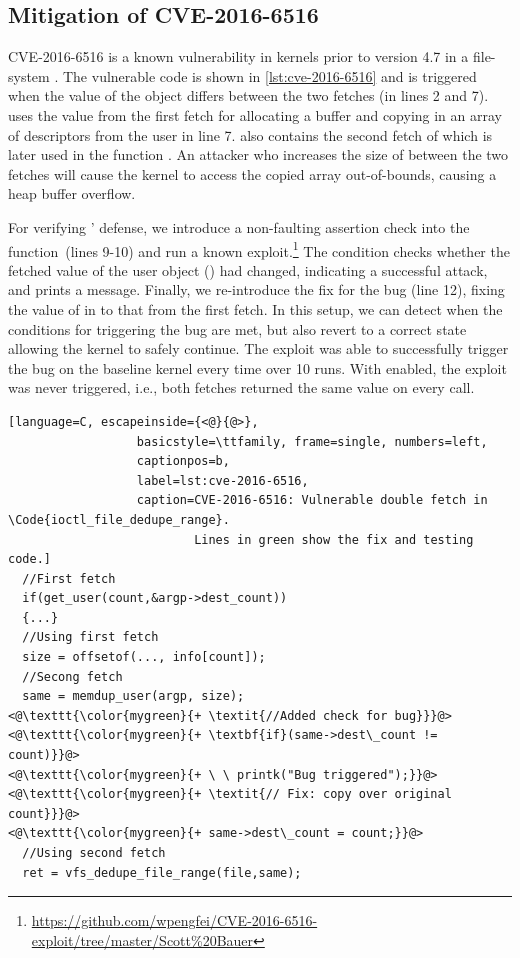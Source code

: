 \documentclass[letterpaper,twocolumn,10pt]{article}
\begin{document}
\subsection{Mitigation of CVE-2016-6516}

CVE-2016-6516 is a known vulnerability in kernels prior to version
4.7 in a file-system .
The vulnerable code is shown in \autoref{lst:cve-2016-6516} and is
triggered when the value of the  object differs between
the two fetches (in lines 2 and 7).
 uses the value from the first fetch for allocating a buffer
and copying in an array of descriptors from the user in line 7.
 also contains the second fetch of 
which is later used in the function .
An attacker who increases the size of  between the
two fetches will cause the kernel to access the copied array out-of-bounds,
causing a heap buffer overflow.

For verifying \midas' defense, we introduce a non-faulting assertion
check into the function~(lines 9-10) and run a known
exploit.\footnote{\url{https://github.com/wpengfei/CVE-2016-6516-exploit/tree/master/Scott\%20Bauer}}
The condition checks whether the fetched value of the user object ()
had changed, indicating a successful attack, and prints a message.
Finally, we re-introduce the fix for the bug (line 12), fixing the value of
 in  to that from the first fetch.
In this setup, we can detect when the conditions for triggering the bug are met,
but also revert to a correct state allowing the kernel to safely
continue.
The exploit was able to successfully trigger the bug on the baseline kernel
every time over 10 runs.
With \midas enabled, the exploit was never triggered, i.e., both fetches
returned the same value on every call.\\


\begin{minipage}{\linewidth}
\begin{lstlisting}[language=C, escapeinside={<@}{@>},
                  basicstyle=\ttfamily, frame=single, numbers=left,
                  captionpos=b,
                  label=lst:cve-2016-6516,
                  caption=CVE-2016-6516: Vulnerable double fetch in \Code{ioctl_file_dedupe_range}.
                          Lines in green show the fix and testing code.]
  //First fetch
  if(get_user(count,&argp->dest_count))
  {...}
  //Using first fetch
  size = offsetof(..., info[count]);
  //Secong fetch
  same = memdup_user(argp, size);
<@\texttt{\color{mygreen}{+ \textit{//Added check for bug}}}@>
<@\texttt{\color{mygreen}{+ \textbf{if}(same->dest\_count != count)}}@>
<@\texttt{\color{mygreen}{+ \ \ printk("Bug triggered");}}@>
<@\texttt{\color{mygreen}{+ \textit{// Fix: copy over original count}}}@>
<@\texttt{\color{mygreen}{+ same->dest\_count = count;}}@>
  //Using second fetch
  ret = vfs_dedupe_file_range(file,same);
\end{lstlisting}
\end{minipage}
\end{document}

